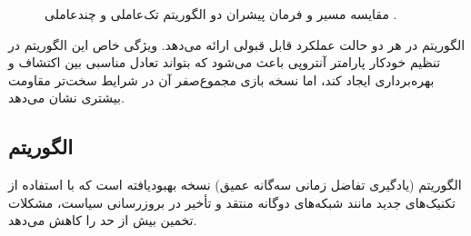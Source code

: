 \begin{figure}[H]
	\centering
	
	
	\caption{
		مقایسه مسیر و فرمان پیشران دو الگوریتم تک‌عاملی و چندعاملی .
	}
\end{figure}

الگوریتم  در هر دو حالت عملکرد قابل قبولی ارائه می‌دهد. ویژگی خاص این الگوریتم در تنظیم خودکار پارامتر آنتروپی باعث می‌شود که بتواند تعادل مناسبی بین اکتشاف و بهره‌برداری ایجاد کند، اما نسخه بازی مجموع‌صفر آن در شرایط سخت‌تر مقاومت بیشتری نشان می‌دهد.

\subsection{الگوریتم }

الگوریتم  (یادگیری تفاضل زمانی سه‌گانه عمیق) نسخه بهبودیافته  است که با استفاده از تکنیک‌های جدید مانند شبکه‌های دوگانه منتقد و تأخیر در بروزرسانی سیاست، مشکلات تخمین بیش از حد را کاهش می‌دهد.


